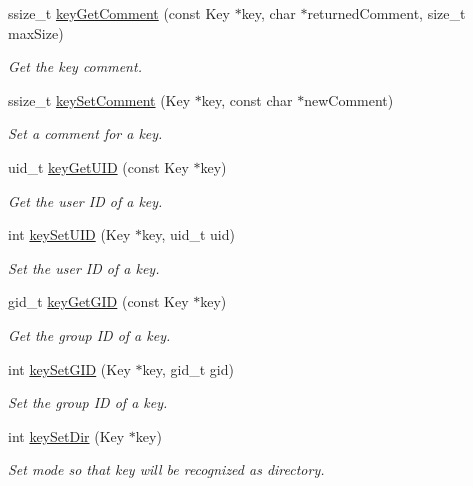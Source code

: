 \begin{DoxyCompactItemize}
ssize\-\_\-t \hyperlink{group__meta_gafb89735689929ff717cc9f2d0d0b46a2}{key\-Get\-Comment} (const Key $\ast$key, char $\ast$returned\-Comment, size\-\_\-t max\-Size)
\begin{DoxyCompactList}\small\item\em Get the key comment. \end{DoxyCompactList}\item 
ssize\-\_\-t \hyperlink{group__meta_ga8863a877a84fa46e6017fe72e49b89c1}{key\-Set\-Comment} (Key $\ast$key, const char $\ast$new\-Comment)
\begin{DoxyCompactList}\small\item\em Set a comment for a key. \end{DoxyCompactList}\item 
uid\-\_\-t \hyperlink{group__meta_gacaa5060e67b03f50ae49a3620c54bc46}{key\-Get\-U\-I\-D} (const Key $\ast$key)
\begin{DoxyCompactList}\small\item\em Get the user I\-D of a key. \end{DoxyCompactList}\item 
int \hyperlink{group__meta_gab5f284f5ecd261e0a290095f50ba1af7}{key\-Set\-U\-I\-D} (Key $\ast$key, uid\-\_\-t uid)
\begin{DoxyCompactList}\small\item\em Set the user I\-D of a key. \end{DoxyCompactList}\item 
gid\-\_\-t \hyperlink{group__meta_ga46a95e81d7d7f4e3eb59e60e5f3738c0}{key\-Get\-G\-I\-D} (const Key $\ast$key)
\begin{DoxyCompactList}\small\item\em Get the group I\-D of a key. \end{DoxyCompactList}\item 
int \hyperlink{group__meta_ga9e3d0fb3f7ba906e067727b9155d22e3}{key\-Set\-G\-I\-D} (Key $\ast$key, gid\-\_\-t gid)
\begin{DoxyCompactList}\small\item\em Set the group I\-D of a key. \end{DoxyCompactList}\item 
int \hyperlink{group__meta_gaae575bd86a628a15ee45baa860522e75}{key\-Set\-Dir} (Key $\ast$key)
\begin{DoxyCompactList}\small\item\em Set mode so that key will be recognized as directory. \end{DoxyCompactList}\item 

\end{DoxyCompactItemize}
